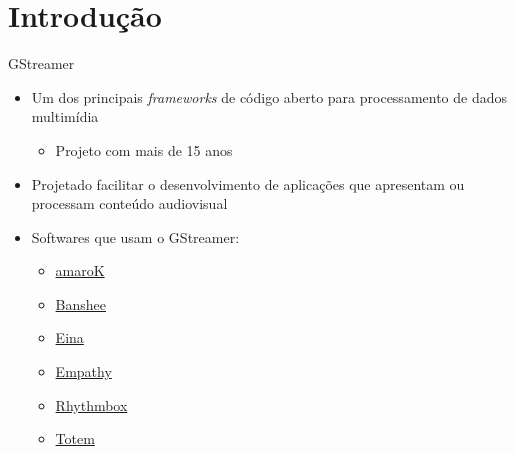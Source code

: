 \documentclass{beamer}
\def\en#1{\foreignlanguage{english}{\emph{#1}}}
\begin{document}
\begin{frame}{\contentsname}
  \tableofcontents
\end{frame}

\section{Introdução}
\label{sub:overview}

\begin{frame}[c]{GStreamer}
  \begin{itemize}
    \item Um dos principais \en{frameworks} de código aberto 
      para processamento de dados multimídia
      \begin{itemize}
        \item Projeto com mais de 15 anos
      \end{itemize}
    \item Projetado facilitar o desenvolvimento de aplicações que apresentam
      ou processam conteúdo audiovisual
    \item Softwares que usam o GStreamer:
      \begin{itemize}
        \item \href{https://amarok.kde.org/}{amaroK}
        \item \href{http://banshee.fm/}{Banshee}
        \item \href{http://eina.sourceforge.net/}{Eina}
        \item \href{https://wiki.gnome.org/Apps/Empathy}{Empathy}
        \item \href{http://www.rhythmbox.org/}{Rhythmbox}
        \item \href{https://wiki.gnome.org/Apps/Videos}{Totem}
      \end{itemize}
  \end{itemize}
\end{frame}
\end{document}
